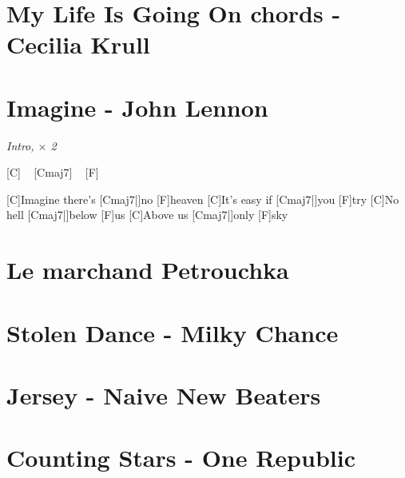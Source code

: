 \documentclass{guitartabs}
\begin{document}
\section{My Life Is Going On chords - Cecilia Krull }
\begin{guitar}

\end{guitar}


\section{Imagine - John Lennon}

\begin{guitar}


\emph{Intro, $\times$ 2}%

[C] ~ [Cmaj7]  ~ [F]  ~  %

[C]Imagine there's [Cmaj7|]{no} [F]heaven
[C]It's easy if [Cmaj7|]{you} [F]try
[C]No hell [Cmaj7|]{below} [F]us
[C]Above us [Cmaj7|]{only} [F]sky
\end{guitar}


\section{Le marchand Petrouchka}
\begin{guitar}

\end{guitar}


\section{Stolen Dance - Milky Chance}

\begin{guitar}

\end{guitar}


\section{Jersey - Naive New Beaters}
\begin{guitar}

\end{guitar}

\section{Counting Stars - One Republic}
\begin{guitar}

\end{guitar}
\end{document}
